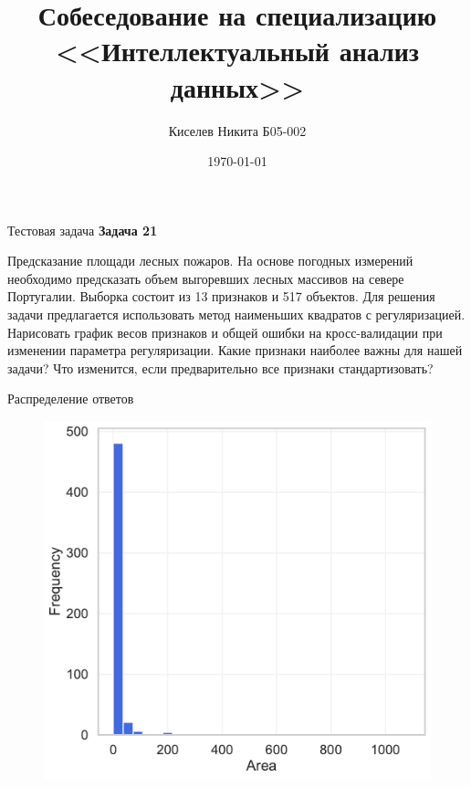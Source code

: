 \documentclass{beamer} %
\title[Тестовая задача]{Собеседование на специализацию <<Интеллектуальный анализ данных>>}
\author{Киселев Никита Б05-002}
\date[\today]{\today}
\institute[МФТИ]{Московский физико-технический институт \\ (национальный исследовательский университет)}
\begin{document}
	
	\begin{frame}
		\maketitle
	\end{frame}

	\begin{frame}{Тестовая задача}
        \textbf{Задача 21}

        Предсказание площади лесных пожаров. На основе погодных измерений необходимо 
        предсказать объем выгоревших лесных массивов на севере Португалии. Выборка 
        состоит из 13 признаков и 517 объектов. Для решения задачи предлагается 
        использовать метод наименьших квадратов с регуляризацией. Нарисовать график 
        весов признаков и общей ошибки на кросс-валидации при изменении параметра 
        регуляризации. Какие признаки наиболее важны для нашей задачи? Что изменится, 
        если предварительно все признаки стандартизовать?
    \end{frame}
	
    \begin{frame}{Распределение ответов}
        \begin{figure}[h!]
            \centering
            \includegraphics[scale = 0.5]{area_distribution.pdf}
        \end{figure}
    \end{frame}
\end{document}
